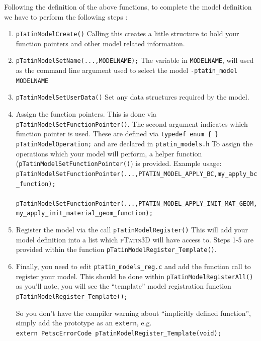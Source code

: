 \documentclass[paper=a4, fontsize=11pt,twoside]{scrartcl}
\newcommand{\ptat}{{{\textsc{pTatin3D}}}}
\newcommand{\shellcmd}[1]{\\\indent\indent\texttt{\hspace{5mm}\footnotesize #1}\\}
\newcommand{\unix}[1]{\texttt{\footnotesize #1}}
\begin{document}
{{Following the definition of the above functions, to complete the model definition we have to perform the following steps :
\begin{enumerate}
	\item \unix{pTatinModelCreate()}
Calling this creates a little structure to hold your function pointers and other model related information.

	\item \unix{pTatinModelSetName(...,MODELNAME);}
The variable in \unix{MODELNAME}, will used as the command line argument used to select the model
	\unix{-ptatin\_model MODELNAME}

	\item \unix{pTatinModelSetUserData()}
Set any data structures required by the model.

	\item Assign the function pointers. This is done via \unix{pTatinModelSetFunctionPointer()}.
The second argument indicates which function pointer is used. These are defined via
\unix{typedef enum \{ \} pTatinModelOperation;}
and are declared in 
\unix{ptatin\_models.h}
To assign the operations which your model will perform, a helper function (\unix{pTatinModelSetFunctionPointer()}) is provided.
Example usage:
\shellcmd{pTatinModelSetFunctionPointer(...,PTATIN\_MODEL\_APPLY\_BC,my\_apply\_bc\_function);}
\shellcmd{pTatinModelSetFunctionPointer(...,PTATIN\_MODEL\_APPLY\_INIT\_MAT\_GEOM,my\_apply\_init\_material\_geom\_function);} %

	\item Register the model via the call
\unix{pTatinModelRegister()}
This will add your model definition into a list which {\ptat} will have access to.
Steps 1-5 are provided within the function \unix{pTatinModelRegister\_Template()}.

	\item Finally, you need to edit
	\unix{ptatin\_models\_reg.c}
and add the function call to register your model.
This should be done within
		\unix{pTatinModelRegisterAll()}
as you'll note, you will see the ``template'' model registration function 	
		\unix{pTatinModelRegister\_Template();}

So you don't have the compiler warning about ``implicitly defined function'', simply add the prototype as an \unix{extern}, e.g.
	\shellcmd{extern PetscErrorCode pTatinModelRegister\_Template(void);}
\end{enumerate}

}}
\end{document}
